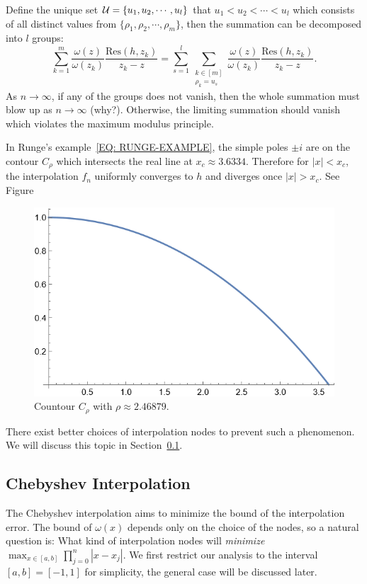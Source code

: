 Define the unique set $\mathcal U = \{u_1, u_2,\cdots, u_l\}$ that $u_1 < u_2<\cdots < u_l$ which consists of all distinct values from $\{ \rho_1, \rho_2, \cdots,  \rho_m\}$, then the summation can be decomposed into $l$ groups:
\begin{equation}
 \sum_{k=1}^m \frac{\omega(z)}{\omega(z_k)}\frac{\mathrm{Res}(h, z_k)}{z_k - z} = \sum_{s=1}^l \sum_{\substack{k\in [m] \\ \rho_k = u_s}} \frac{\omega(z)}{\omega(z_k)}\frac{\mathrm{Res}(h, z_k)}{z_k - z}.
\end{equation}
As $n\to\infty$, if any of the groups does not vanish, then the whole summation must blow up as $n\to\infty$ (why?). Otherwise, the limiting summation should vanish which violates the maximum modulus principle. 

In Runge's example~\eqref{EQ: RUNGE-EXAMPLE}, the simple poles $\pm i$ are on the contour $C_{\rho}$ which intersects the real line at $x_c\approx 3.6334$. Therefore for $|x| < x_c$, the interpolation $f_n$ uniformly converges to $h$ and diverges once $|x| > x_c$. See Figure
\begin{figure}[!htb]
    \centering
    \includegraphics[scale=0.65]{Figures/contour-curve.png}
    \caption{Countour $C_{\rho}$ with $\rho \approx 2.46879$.}
    \label{fig:enter-label}
\end{figure}
There exist better choices of interpolation nodes to prevent such a phenomenon. We will discuss this topic in Section~\ref{Sec: 2-Che-Int}. 

\subsection{Chebyshev Interpolation}
\label{Sec: 2-Che-Int}
The Chebyshev interpolation aims to minimize the bound of the interpolation error. The bound of $\omega(x)$ depends only on the choice of the nodes, so a natural question is: What kind of interpolation nodes will \emph{minimize} 
$\max_{x\in [a, b]} \prod_{j=0}^n |x-x_j|$. We first restrict our analysis to the interval $[a, b] = [-1,1]$ for simplicity, the general case will be discussed later.
 
